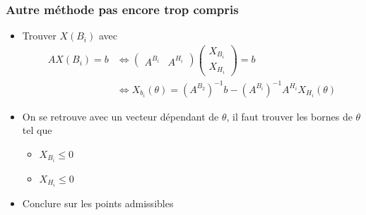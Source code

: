 \documentclass{article}
\theoremstyle{plain}%
\theoremstyle{definition}
\theoremstyle{remark}
\begin{document}
\subsubsection{Autre méthode pas encore trop compris}
\begin{itemize}
    \item Trouver $ X(B_i) $ avec
    \begin{align*}
        AX(B_i) = b &\Leftrightarrow \begin{pmatrix} A^{B_i} & A^{H_i} \end{pmatrix} \begin{pmatrix} X_{B_i} \\ X_{H_i} \end{pmatrix} = b \\
        &\Leftrightarrow X_{b_i}(\theta ) = (A^{B_2})^{-1}b - (A^{B_i})^{-1} A^{H_i} X_{H_i}(\theta )
    \end{align*}
    \item On se retrouve avec un vecteur dépendant de $ \theta  $, il faut trouver les bornes de $ \theta $ tel que \begin{itemize}
        \item $ X_{B_i} \leq 0 $
        \item $ X_{H_i} \leq 0 $
    \end{itemize}
    \item Conclure sur les points admissibles 
\end{itemize}
\end{document}
